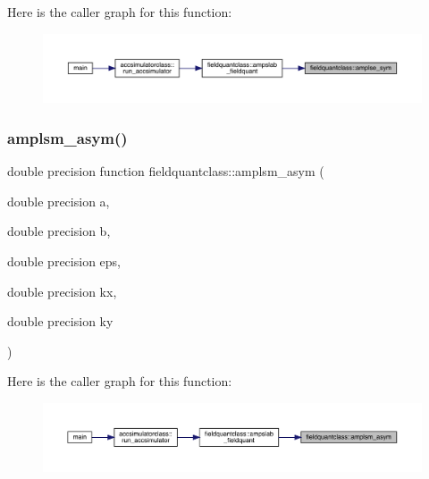 Here is the caller graph for this function\+:\nopagebreak
\begin{figure}[H]
\begin{center}
\leavevmode
\includegraphics[width=350pt]{namespacefieldquantclass_a8eb7b870ec7c240279076fbb6269ff07_icgraph}
\end{center}
\end{figure}
\mbox{\label{namespacefieldquantclass_ac67e15255b5d57fb3c3a29ef79addb63}} 
\subsubsection{\texorpdfstring{amplsm\_asym()}{amplsm\_asym()}}
{\footnotesize\ttfamily double precision function fieldquantclass\+::amplsm\+\_\+asym (\begin{DoxyParamCaption}\item[{double precision}]{a,  }\item[{double precision}]{b,  }\item[{double precision}]{eps,  }\item[{double precision}]{kx,  }\item[{double precision}]{ky }\end{DoxyParamCaption})}

Here is the caller graph for this function\+:\nopagebreak
\begin{figure}[H]
\begin{center}
\leavevmode
\includegraphics[width=350pt]{namespacefieldquantclass_ac67e15255b5d57fb3c3a29ef79addb63_icgraph}
\end{center}
\end{figure}
\mbox{\label{namespacefieldquantclass_aaf0193e68163e6fb2bba0a9477f19cb0}} 
